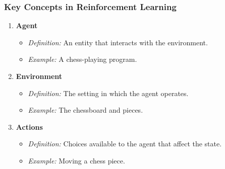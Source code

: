 \documentclass[aspectratio=169]{beamer}
\begin{document}
\begin{frame}[fragile]
    \frametitle{Key Concepts in Reinforcement Learning}
    \begin{enumerate}
        \item \textbf{Agent}
            \begin{itemize}
                \item \textit{Definition:} An entity that interacts with the environment.
                \item \textit{Example:} A chess-playing program.
            \end{itemize}
        
        \item \textbf{Environment}
            \begin{itemize}
                \item \textit{Definition:} The setting in which the agent operates.
                \item \textit{Example:} The chessboard and pieces.
            \end{itemize}
        
        \item \textbf{Actions}
            \begin{itemize}
                \item \textit{Definition:} Choices available to the agent that affect the state.
                \item \textit{Example:} Moving a chess piece.
            \end{itemize}
    \end{enumerate}
\end{frame}
\end{document}
